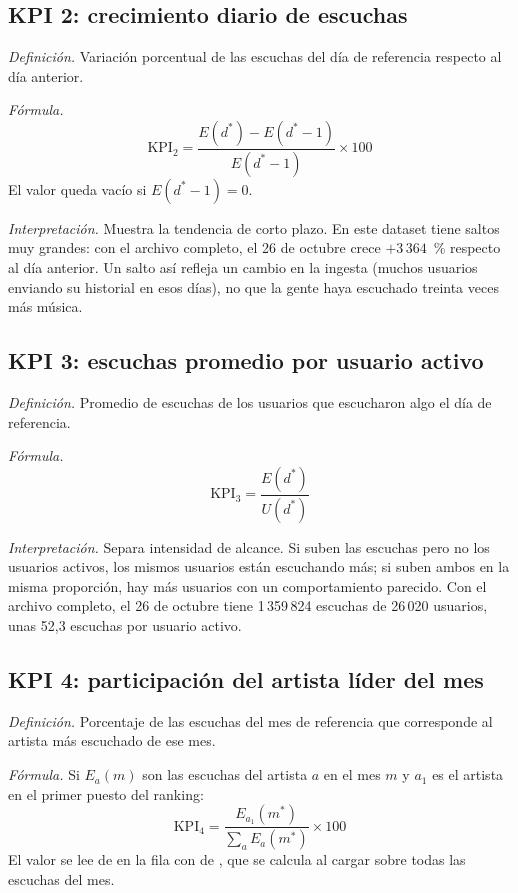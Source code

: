 \subsection{KPI 2: crecimiento diario de escuchas}

\textit{Definición.} Variación porcentual de las escuchas del día de referencia respecto al día anterior.

\textit{Fórmula.}
\[
\text{KPI}_2 = \frac{E(d^{*}) - E(d^{*}-1)}{E(d^{*}-1)} \times 100
\]
El valor queda vacío si $E(d^{*}-1) = 0$.

\textit{Interpretación.} Muestra la tendencia de corto plazo. En este dataset tiene saltos muy grandes: con el archivo completo, el 26 de octubre crece $+3\,364$~\% respecto al día anterior. Un salto así refleja un cambio en la ingesta (muchos usuarios enviando su historial en esos días), no que la gente haya escuchado treinta veces más música.

\subsection{KPI 3: escuchas promedio por usuario activo}

\textit{Definición.} Promedio de escuchas de los usuarios que escucharon algo el día de referencia.

\textit{Fórmula.}
\[
\text{KPI}_3 = \frac{E(d^{*})}{U(d^{*})}
\]

\textit{Interpretación.} Separa intensidad de alcance. Si suben las escuchas pero no los usuarios activos, los mismos usuarios están escuchando más; si suben ambos en la misma proporción, hay más usuarios con un comportamiento parecido. Con el archivo completo, el 26 de octubre tiene 1\,359\,824 escuchas de 26\,020 usuarios, unas 52,3 escuchas por usuario activo.

\subsection{KPI 4: participación del artista líder del mes}

\textit{Definición.} Porcentaje de las escuchas del mes de referencia que corresponde al artista más escuchado de ese mes.

\textit{Fórmula.} Si $E_{a}(m)$ son las escuchas del artista $a$ en el mes $m$ y $a_1$ es el artista en el primer puesto del ranking:
\[
\text{KPI}_4 = \frac{E_{a_1}(m^{*})}{\sum_{a} E_{a}(m^{*})} \times 100
\]
El valor se lee de  en la fila con  de , que se calcula al cargar sobre todas las escuchas del mes.

